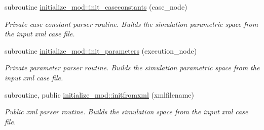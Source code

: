 \begin{DoxyCompactItemize}
subroutine \hyperlink{namespaceinitialize__mod_a9d19665b9ac12c3db8b0842bfdb6fa0c}{initialize\+\_\+mod\+::init\+\_\+caseconstants} (case\+\_\+node)
\begin{DoxyCompactList}\small\item\em Private case constant parser routine. Builds the simulation parametric space from the input xml case file. \end{DoxyCompactList}\item 
subroutine \hyperlink{namespaceinitialize__mod_aac9d9dabb797c83e360f9ae60a7e65e3}{initialize\+\_\+mod\+::init\+\_\+parameters} (execution\+\_\+node)
\begin{DoxyCompactList}\small\item\em Private parameter parser routine. Builds the simulation parametric space from the input xml case file. \end{DoxyCompactList}\item 
subroutine, public \hyperlink{namespaceinitialize__mod_a107012ffec69fe2d7c524d240193439e}{initialize\+\_\+mod\+::initfromxml} (xmlfilename)
\begin{DoxyCompactList}\small\item\em Public xml parser routine. Builds the simulation space from the input xml case file. \end{DoxyCompactList}\end{DoxyCompactItemize}
